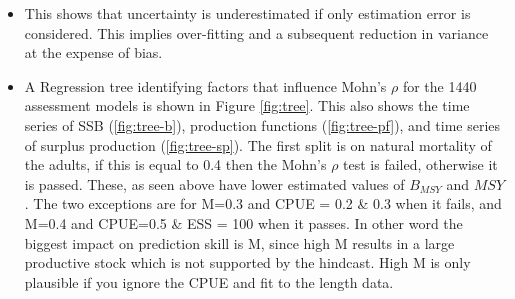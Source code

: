 \begin{itemize}
   \item This shows that uncertainty is underestimated if only estimation error is considered. This implies over-fitting and a subsequent reduction in variance at the expense of bias. 
   
   
   

   \item A Regression tree identifying factors that influence Mohn's $\rho$ for the 1440 assessment models is shown in Figure \ref{fig:tree}. This also shows the time series of SSB (\ref{fig:tree-b}), production functions (\ref{fig:tree-pf}), and time series of surplus production (\ref{fig:tree-sp}). The first split is on natural mortality of the adults, if this is equal to 0.4 then the Mohn's $\rho$ test is failed, otherwise it is passed. These, as seen above have lower estimated values of $B_{MSY}$ and $MSY$. The two exceptions are for M=0.3 and CPUE = 0.2 \& 0.3 when it fails, and M=0.4 and CPUE=0.5 \& ESS = 100 when it passes. In other word the biggest impact on prediction skill is M, since high M results in a large productive stock which is not supported by the hindcast. High M is only plausible if you ignore the CPUE and fit to the length data. 
   

\end{itemize}
